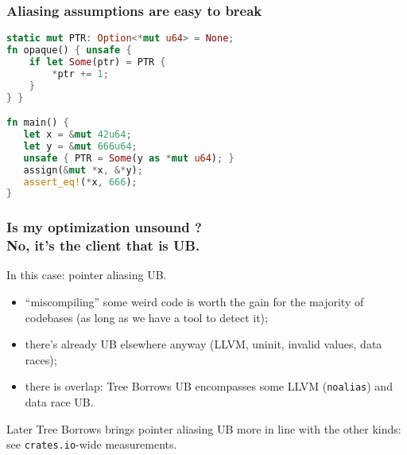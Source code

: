 \begin{frame}[fragile]
    \frametitle{Aliasing assumptions are easy to break}
    \begin{block}{}
        \begin{lstlisting}[language=rust]
static mut PTR: Option<*mut u64> = None;
fn opaque() { unsafe {
    if let Some(ptr) = PTR {
        *ptr += 1;
    }
} }

fn main() {
   let x = &mut 42u64;
   let y = &mut 666u64;
   unsafe { PTR = Some(y as *mut u64); }
   assign(&mut *x, &*y);
   assert_eq!(*x, 666);
}
        \end{lstlisting}
    \end{block}
\end{frame}

\begin{frame}
    \frametitle{Is my optimization unsound ?\\No, it's the client that is UB.}
    In this case: pointer aliasing UB.


    \begin{itemize}
        \item ``miscompiling'' some weird code is worth the gain for the majority of codebases
            (as long as we have a tool to detect it);
        \item there's already UB elsewhere anyway (LLVM, uninit, invalid values, data races);
        \item there is overlap: Tree Borrows UB encompasses some LLVM (\texttt{noalias}) and
            data race UB.
    \end{itemize}
    \begin{block}{Later}
        Tree Borrows brings pointer aliasing UB more in line with the other kinds:
        see \texttt{crates.io}-wide measurements.
    \end{block}
\end{frame}

